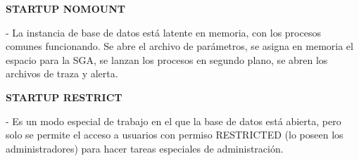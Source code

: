 \documentclass[12pt,letterpaper]{article}
\begin{document}
\textbf{STARTUP NOMOUNT} \ 
\begin{itemize}
- La instancia de base de datos está latente en memoria, con los procesos comunes funcionando. Se abre el archivo de parámetros, se asigna en memoria el espacio para la SGA, se lanzan los procesos en segundo plano, se abren los archivos de traza y alerta.\\
\end{itemize} 



\textbf{STARTUP RESTRICT} \ 
\begin{itemize}
- Es un modo especial de trabajo en el que la base de datos está abierta, pero solo se permite el acceso a usuarios con permiso RESTRICTED (lo poseen los administradores) para hacer tareas especiales de administración.\\
\end{itemize} 
\end{document}
